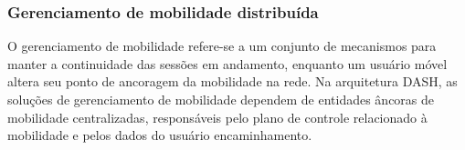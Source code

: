 

\subsubsection{Gerenciamento de mobilidade distribuída}
\label{subsec:handover}

O gerenciamento de mobilidade refere-se a um conjunto de mecanismos para manter a continuidade das sessões em andamento, enquanto um usuário móvel altera seu ponto de ancoragem da mobilidade na rede.
Na arquitetura DASH, as soluções de gerenciamento de mobilidade dependem de entidades âncoras de mobilidade centralizadas, responsáveis pelo plano de controle relacionado à mobilidade e pelos dados do usuário encaminhamento. 


